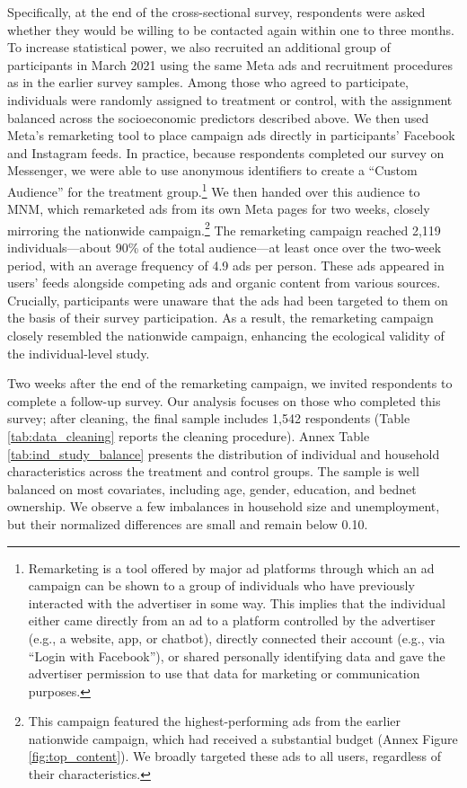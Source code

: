 Specifically, at the end of the cross-sectional survey, respondents were asked whether they would be willing to be contacted again within one to three months. To increase statistical power, we also recruited an additional group of participants in March 2021 using the same Meta ads and recruitment procedures as in the earlier survey samples. Among those who agreed to participate, individuals were randomly assigned to treatment or control, with the assignment balanced across the socioeconomic predictors described above. We then used Meta’s remarketing tool to place campaign ads directly in participants’ Facebook and Instagram feeds. In practice, because respondents completed our survey on Messenger, we were able to use anonymous identifiers to create a ``Custom Audience'' for the treatment group.\footnote{Remarketing is a tool offered by major ad platforms through which an ad campaign can be shown to a group of individuals who have previously interacted with the advertiser in some way. This implies that the individual either came directly from an ad to a platform controlled by the advertiser (e.g., a website, app, or chatbot), directly connected their account (e.g., via ``Login with Facebook''), or shared personally identifying data and gave the advertiser permission to use that data for marketing or communication purposes.} We then handed over this audience to MNM, which remarketed ads from its own Meta pages for two weeks, closely mirroring the nationwide campaign.\footnote{This campaign featured the highest-performing ads from the earlier nationwide campaign, which had received a substantial budget (Annex Figure \ref{fig:top_content}). We broadly targeted these ads to all users, regardless of their characteristics.} The remarketing campaign reached 2,119 individuals---about 90\% of the total audience---at least once over the two-week period, with an average frequency of 4.9 ads per person. These ads appeared in users' feeds alongside competing ads and organic content from various sources. Crucially, participants were unaware that the ads had been targeted to them on the basis of their survey participation. As a result, the remarketing campaign closely resembled the nationwide campaign, enhancing the ecological validity of the individual-level study.

Two weeks after the end of the remarketing campaign, we invited respondents to complete a follow-up survey. Our analysis focuses on those who completed this survey; after cleaning, the final sample includes 1,542 respondents (Table \ref{tab:data_cleaning} reports the cleaning procedure). Annex Table \ref{tab:ind_study_balance} presents the distribution of individual and household characteristics across the treatment and control groups. The sample is well balanced on most covariates, including age, gender, education, and bednet ownership. We observe a few imbalances in household size and unemployment, but their normalized differences are small and remain below 0.10.

